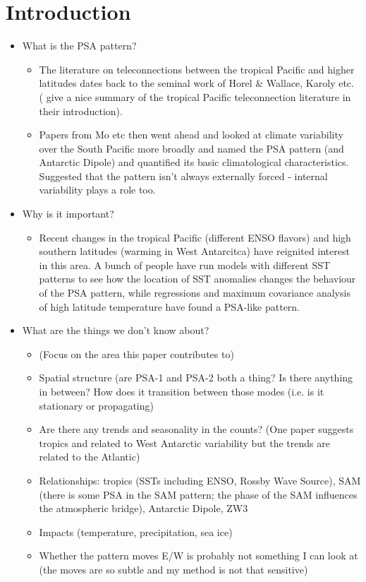 \section{Introduction}

\begin{itemize}
\item What is the PSA pattern?
\begin{itemize}
\item The literature on teleconnections between the tropical Pacific and higher latitudes dates back to the seminal work of Horel & Wallace, Karoly etc. (\citet{Ciasto2015} give a nice summary of the tropical Pacific teleconnection literature in their introduction).
\item Papers from Mo etc then went ahead and looked at climate variability over the South Pacific more broadly and named the PSA pattern (and Antarctic Dipole) and quantified its basic climatological characteristics. Suggested that the pattern isn't always externally forced - internal variability plays a role too.
\end{itemize}

\item Why is it important?
\begin{itemize}
\item Recent changes in the tropical Pacific (different ENSO flavors) and high southern latitudes (warming in West Antarcitca) have reignited interest in this area. A bunch of people have run models with different SST patterns to see how the location of SST anomalies changes the behaviour of the PSA pattern, while regressions and maximum covariance analysis of high latitude temperature have found a PSA-like pattern. 
\end{itemize}

\item What are the things we don't know about? 
\begin{itemize}
\item (Focus on the area this paper contributes to)
\item Spatial structure (are PSA-1 and PSA-2 both a thing? Is there anything in between? How does it transition between those modes (i.e. is it stationary or propagating)
\item Are there any trends and seasonality in the counts? (One paper suggests tropics and related to West Antarctic variability but the trends are related to the Atlantic)
\item Relationships: tropics (SSTs including ENSO, Rossby Wave Source), SAM (there is some PSA in the SAM pattern; the phase of the SAM influences the atmospheric bridge), Antarctic Dipole, ZW3
\item Impacts (temperature, precipitation, sea ice) 
\item Whether the pattern moves E/W is probably not something I can look at (the moves are so subtle and my method is not that sensitive)
\end{itemize}


\end{itemize}
